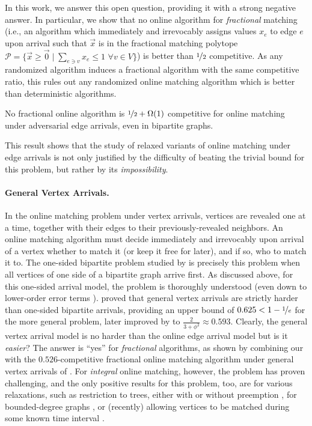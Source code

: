In this work, we answer this open question, providing it with a strong negative answer. In particular, we show that no online algorithm for \emph{fractional} matching (i.e., an algorithm which immediately and irrevocably assigns values $x_e$ to edge $e$ upon arrival such that $\vec{x}$ is in the fractional matching polytope $\mathcal{P}=\{\vec{x}\geq \vec{0}\mid \sum_{e\ni v}x_e \leq 1\,\, \forall v\in V\}$) is better than $\nicefrac{1}{2}$ competitive. As any randomized algorithm induces a fractional algorithm with the same competitive ratio, this rules out any randomized online matching algorithm which is better than deterministic algorithms.

\begin{thm}\label{thm:edge-intro}
	No fractional online algorithm is $\nicefrac{1}{2}+\Omega(1)$ competitive for online matching under adversarial edge arrivals, even in bipartite graphs.
\end{thm}

This result shows that the study of relaxed variants of online matching under edge arrivals is not only justified by the difficulty of beating the trivial bound for this problem, 
but rather by its \emph{impossibility}.

\vspace{-0.1cm}
\paragraph{General Vertex Arrivals.} In the online matching problem under vertex arrivals, 
vertices are revealed one at a time, together with their edges to their previously-revealed neighbors. An online matching algorithm must decide immediately and irrevocably upon arrival of a vertex whether to match it (or keep it free for later), and if so, who to match it to.
The one-sided bipartite problem studied by \citet{karp1990optimal} is precisely this problem when all vertices of one side of a bipartite graph arrive first. As discussed above, for this one-sided arrival model, the problem is thoroughly understood (even down to lower-order error terms \cite{feige2018tighter}). 
\citet{wang2015two} proved that general vertex arrivals are strictly harder than one-sided bipartite arrivals, providing an upper bound of $0.625 < 1-\nicefrac{1}{e}$ for the more general problem, later improved by \citet{buchbinder2018online} to $\frac{2}{3+\phi^2}\approx 0.593$. 
Clearly, the general vertex arrival model is no harder than the online edge arrival model
but is it \emph{easier}? The answer is ``yes'' for \emph{fractional} algorithms, as shown by combining our  with the $0.526$-competitive fractional online matching algorithm under general vertex arrivals of \citet{wang2015two}. For \emph{integral} online matching, however, the problem has proven challenging, and the only positive results for this problem, too, are for various relaxations, such as 
restriction to trees, either with or without preemption \cite{tirodkar2017maximum,chiplunkar2015randomized,buchbinder2018online}, for bounded-degree graphs \cite{buchbinder2018online}, or (recently) allowing vertices to be matched during some known time interval \cite{huang2018match,huang2019tight}.
	

